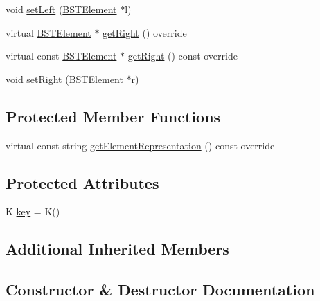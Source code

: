 \begin{DoxyCompactItemize}
\item 
void \mbox{\hyperlink{classbridges_1_1datastructure_1_1_b_s_t_element_a5810ed79b697d691f4d8a75c2f9b639f}{set\+Left}} (\mbox{\hyperlink{classbridges_1_1datastructure_1_1_b_s_t_element}{B\+S\+T\+Element}} $\ast$l)
\item 
virtual \mbox{\hyperlink{classbridges_1_1datastructure_1_1_b_s_t_element}{B\+S\+T\+Element}} $\ast$ \mbox{\hyperlink{classbridges_1_1datastructure_1_1_b_s_t_element_a80f5085d6d03805dd3091b7693d8e235}{get\+Right}} () override
\item 
virtual const \mbox{\hyperlink{classbridges_1_1datastructure_1_1_b_s_t_element}{B\+S\+T\+Element}} $\ast$ \mbox{\hyperlink{classbridges_1_1datastructure_1_1_b_s_t_element_a012f0eb09c3d62b14c73109e6ded0879}{get\+Right}} () const override
\item 
void \mbox{\hyperlink{classbridges_1_1datastructure_1_1_b_s_t_element_a9656227e934249edd0e414189c2cdae9}{set\+Right}} (\mbox{\hyperlink{classbridges_1_1datastructure_1_1_b_s_t_element}{B\+S\+T\+Element}} $\ast$r)
\end{DoxyCompactItemize}
\subsection*{Protected Member Functions}
\begin{DoxyCompactItemize}
\item 
virtual const string \mbox{\hyperlink{classbridges_1_1datastructure_1_1_b_s_t_element_a8f962a01b6e0eff59abeee7768264fd9}{get\+Element\+Representation}} () const override
\end{DoxyCompactItemize}
\subsection*{Protected Attributes}
\begin{DoxyCompactItemize}
\item 
K \mbox{\hyperlink{classbridges_1_1datastructure_1_1_b_s_t_element_ac1d971f8379c4ce6b956ebd635c88895}{key}} = K()
\end{DoxyCompactItemize}
\subsection*{Additional Inherited Members}


\subsection{Constructor \& Destructor Documentation}
\mbox{\label{classbridges_1_1datastructure_1_1_b_s_t_element_a861caf985c223a9a848082fd5a4974fd}} 
